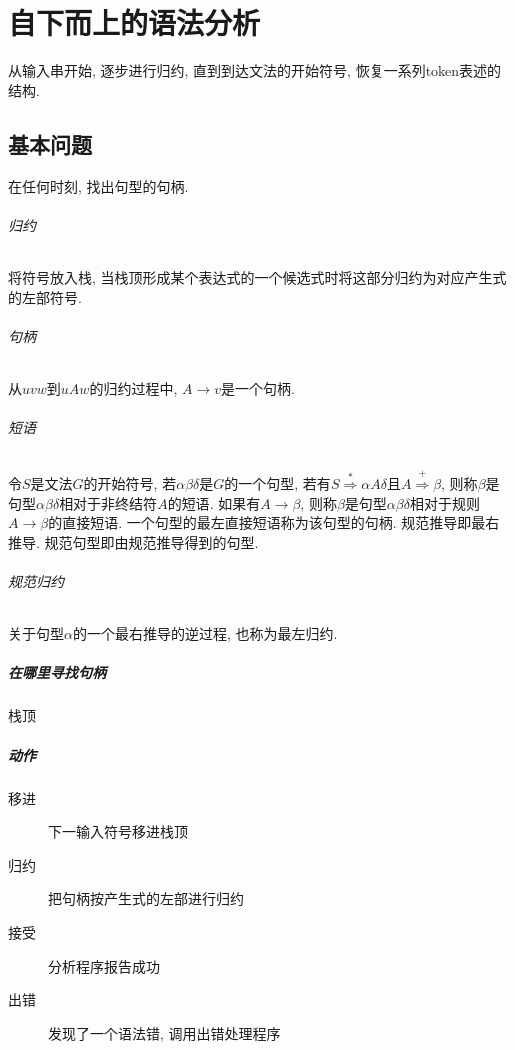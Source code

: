 \newcommand\eqdot{=\hskip -.8em\cdot\ }

\chapter{自下而上的语法分析}

    从输入串开始, 逐步进行\textsf{归约}, 直到到达文法的开始符号, 恢复一系列token表述的结构.

    \section{基本问题}

        在任何时刻, 找出句型的句柄.

        \subparagraph{归约} 将符号放入栈, 当栈顶形成某个表达式的一个候选式时将这部分归约为对应产生式的左部符号.

        \subparagraph{句柄} 从$uvw$到$uAw$的归约过程中, $A\to v$是一个句柄.

        \subparagraph{短语} 令$S$是文法$G$的开始符号, 若$\alpha\beta\delta$是$G$的一个句型, 若有$S\stackrel{*}{\Rightarrow}\alpha A\delta$且$A\stackrel{+}{\Rightarrow}\beta$, 则称$\beta$是句型$\alpha\beta\delta$相对于非终结符$A$的\textsf{短语}. 如果有$A\to\beta$, 则称$\beta$是句型$\alpha\beta\delta$相对于规则$A\to\beta$的\textsf{直接短语}. 一个句型的\textsf{最左直接短语}称为该句型的\textsf{句柄}. \textsf{规范推导}即最右推导. \textsf{规范句型}即由规范推导得到的句型.

        \subparagraph{规范归约} 关于句型$\alpha$的一个最右推导的逆过程, 也称为\textsf{最左归约}.

        \paragraph{在哪里寻找句柄}
            栈顶

        \paragraph{动作}
        \begin{description}
            \item[移进] 下一输入符号移进栈顶
            \item[归约] 把句柄按产生式的左部进行归约
            \item[接受] 分析程序报告成功
            \item[出错] 发现了一个语法错, 调用出错处理程序
        \end{description}

